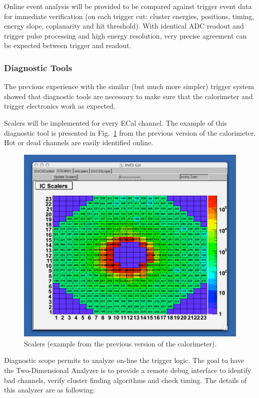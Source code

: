 Online event analysis will be provided to be compared against trigger event data for immediate verification (on each trigger cut: cluster energies, positions, timing, energy slope, coplanarity and hit threshold). With identical ADC readout and trigger pulse processing and high energy resolution, very precise agreement can be expected between trigger and readout.


\subsubsection{Diagnostic Tools}

The previous experience with the similar (but much more simpler) trigger system showed that diagnostic tools are necessary to make sure that the calorimeter and trigger electronics work as expected. 

Scalers will be implemented for every ECal channel. The example of this diagnostic tool is presented in Fig.~\ref{fig:dvcs_beam}
from the previous version of the calorimeter. Hot or dead channels are easily identified online.
\begin{figure}[h]
\includegraphics[scale=0.6]{daq_trigger/figures/dvcs_beam}
\caption{\small{Scalers (example from the previous version of the calorimeter).}}
\label{fig:dvcs_beam}
\end{figure}
Diagnostic scope permits to analyze on-line  the trigger logic. The goal to have  the Two-Dimensional Analyzer
 is to provide a remote debug interface to identify bad channels, verify cluster finding algorithms and check timing.
 The details of this analyzer are as following:
 
